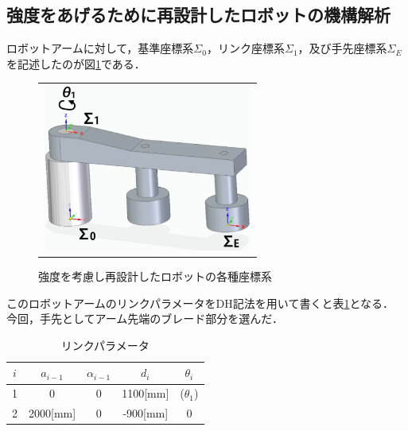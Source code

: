 \subsection{強度をあげるために再設計したロボットの機構解析}\label{ux5f37ux5ea6ux3092ux3042ux3052ux308bux305fux3081ux306bux518dux8a2dux8a08ux3057ux305fux30edux30dcux30c3ux30c8ux306eux6a5fux69cbux89e3ux6790}

ロボットアームに対して，基準座標系\(\Sigma_0\)，リンク座標系\(\Sigma_1\)，及び手先座標系\(\Sigma_E\)を記述したのが図\ref{strong-tesaki}である．

\begin{figure}[htbp]
  \begin{center}
    \begin{tabular}{c}
      \includegraphics[height=5.5cm]{img/eps/strong-dh.eps}
    \end{tabular}
    \caption{強度を考慮し再設計したロボットの各種座標系}
    \label{strong-tesaki}
  \end{center}
\end{figure}

このロボットアームのリンクパラメータをDH記法を用いて書くと表\ref{strong-dh-link}となる．
今回，手先としてアーム先端のブレード部分を選んだ．

\begin{table}[htb]
\caption[]{リンクパラメータ}
  \begin{center}
    \begin{tabular}{|c|c|c|c|c|} \hline
      $i$ & $a_{i-1}$ & $\alpha_{i-1}$ & $d_i$ & $\theta_i$\\ \hline \hline
      1 & 0 & 0 & 1100[mm] & ($\theta_1$) \\ \hline
      2 & 2000[mm] & 0 & -900[mm] & 0 \\ \hline
    \end{tabular}
    \label{strong-dh-link}
  \end{center}
\end{table}

